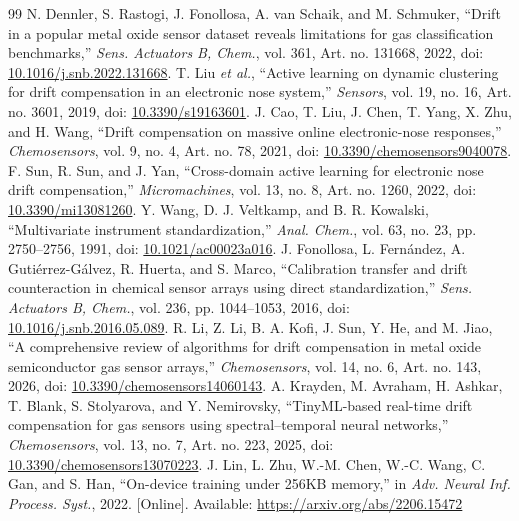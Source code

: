 \begin{thebibliography}{99}
 N. Dennler, S. Rastogi, J. Fonollosa, A. van Schaik, and M. Schmuker, ``Drift in a popular metal oxide sensor dataset reveals limitations for gas classification benchmarks,'' \emph{Sens. Actuators B, Chem.}, vol. 361, Art. no. 131668, 2022, doi: \href{https://doi.org/10.1016/j.snb.2022.131668}{10.1016/j.snb.2022.131668}.
 T. Liu \emph{et al.}, ``Active learning on dynamic clustering for drift compensation in an electronic nose system,'' \emph{Sensors}, vol. 19, no. 16, Art. no. 3601, 2019, doi: \href{https://doi.org/10.3390/s19163601}{10.3390/s19163601}.
 J. Cao, T. Liu, J. Chen, T. Yang, X. Zhu, and H. Wang, ``Drift compensation on massive online electronic-nose responses,'' \emph{Chemosensors}, vol. 9, no. 4, Art. no. 78, 2021, doi: \href{https://doi.org/10.3390/chemosensors9040078}{10.3390/chemosensors9040078}.
 F. Sun, R. Sun, and J. Yan, ``Cross-domain active learning for electronic nose drift compensation,'' \emph{Micromachines}, vol. 13, no. 8, Art. no. 1260, 2022, doi: \href{https://doi.org/10.3390/mi13081260}{10.3390/mi13081260}.
 Y. Wang, D. J. Veltkamp, and B. R. Kowalski, ``Multivariate instrument standardization,'' \emph{Anal. Chem.}, vol. 63, no. 23, pp. 2750--2756, 1991, doi: \href{https://doi.org/10.1021/ac00023a016}{10.1021/ac00023a016}.
 J. Fonollosa, L. Fern\'andez, A. Guti\'errez-G\'alvez, R. Huerta, and S. Marco, ``Calibration transfer and drift counteraction in chemical sensor arrays using direct standardization,'' \emph{Sens. Actuators B, Chem.}, vol. 236, pp. 1044--1053, 2016, doi: \href{https://doi.org/10.1016/j.snb.2016.05.089}{10.1016/j.snb.2016.05.089}.
 R. Li, Z. Li, B. A. Kofi, J. Sun, Y. He, and M. Jiao, ``A comprehensive review of algorithms for drift compensation in metal oxide semiconductor gas sensor arrays,'' \emph{Chemosensors}, vol. 14, no. 6, Art. no. 143, 2026, doi: \href{https://doi.org/10.3390/chemosensors14060143}{10.3390/chemosensors14060143}.
 A. Krayden, M. Avraham, H. Ashkar, T. Blank, S. Stolyarova, and Y. Nemirovsky, ``TinyML-based real-time drift compensation for gas sensors using spectral--temporal neural networks,'' \emph{Chemosensors}, vol. 13, no. 7, Art. no. 223, 2025, doi: \href{https://doi.org/10.3390/chemosensors13070223}{10.3390/chemosensors13070223}.
 J. Lin, L. Zhu, W.-M. Chen, W.-C. Wang, C. Gan, and S. Han, ``On-device training under 256KB memory,'' in \emph{Adv. Neural Inf. Process. Syst.}, 2022. [Online]. Available: \url{https://arxiv.org/abs/2206.15472}

\end{thebibliography}
